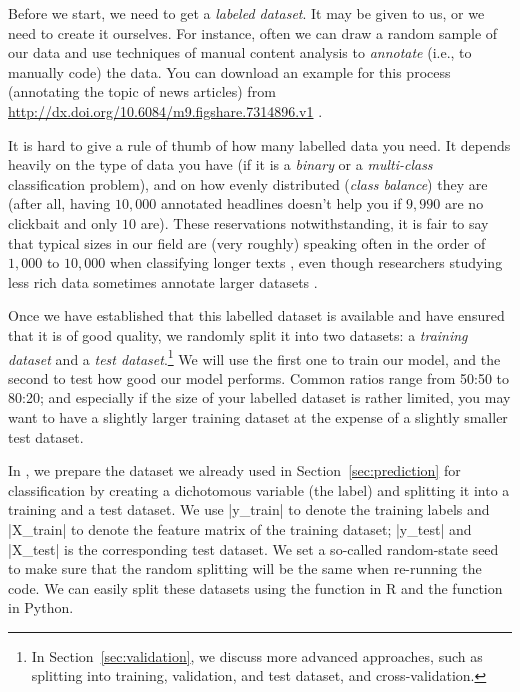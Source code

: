 Before we start, we need to get a \emph{labeled dataset}.
It may be given to us, or we need to create it ourselves.
For instance, often we can draw a random sample of our data and use techniques
of manual content analysis \citep[e.g.,][]{riffe2019analyzing} to
\emph{annotate} (i.e., to manually code) the data.
You can download an example for this process (annotating the topic of news
articles) from \url{http://dx.doi.org/10.6084/m9.figshare.7314896.v1} \citep{Vermeer2018}.

It is hard to give a rule of thumb of how many labelled data you need.
It depends heavily on the type of data you have (if it is a \emph{binary} or a \emph{multi-class} classification problem), and on how evenly distributed (\emph{class balance}) they are (after all, having $10,000$ annotated headlines doesn't help you if $9,990$ are no clickbait and only $10$ are).
These reservations notwithstanding, it is fair to say that typical sizes in
our field are (very roughly) speaking often in the order of $1,000$ to $10,000$
when classifying longer texts \citep[see]{Burscher2014},
even though researchers studying less rich data sometimes annotate larger
datasets \citep[e.g., $60,000$ social media messages in][]{vermeer2019seeing}.

Once we have established that this labelled dataset is available and
have ensured that it is of good quality, we randomly split it into two
datasets: a \emph{training dataset} and a \emph{test
  dataset}.\footnote{In Section~\ref{sec:validation}, we discuss more
  advanced approaches, such as splitting into training, validation,
  and test dataset, and cross-validation.}  We will use the first one
to train our model, and the second to test how good our model
performs. Common ratios range from 50:50 to 80:20; and especially if
the size of your labelled dataset is rather limited, you may want to
have a slightly larger training dataset at the expense of a slightly
smaller test dataset.

In , we prepare the dataset we already used in
Section~\ref{sec:prediction} for classification by creating a
dichotomous variable (the label) and splitting it into a training and
a test dataset. We use |y_train| to denote the training labels and
|X_train| to denote the feature matrix of the training dataset;
|y_test| and |X_test| is the corresponding test dataset. We set a
so-called random-state seed to make sure that the random splitting
will be the same when re-running the code. We can easily split these datasets using the  function  in R and the  function  in Python.

